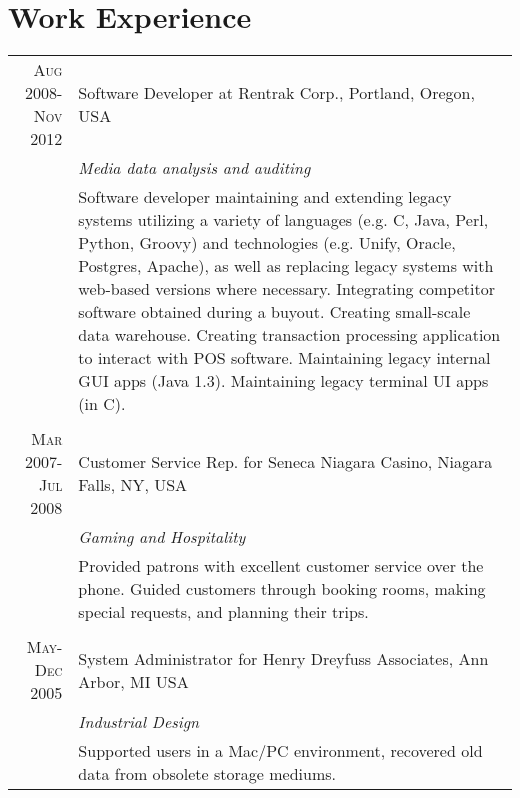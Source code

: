 \documentclass[a4paper,10pt]{article}
\begin{document}
\section{Work Experience}
\begin{tabular}{r|p{11cm}}
    \textsc{Aug 2008-Nov 2012}  & Software Developer at Rentrak Corp., Portland, Oregon, USA\\
                                & \emph{Media data analysis and auditing}\\
                                & \fontsize{9pt}{10pt}\selectfont
                                        Software developer maintaining and extending legacy systems utilizing a variety
                                        of languages (e.g. C, Java, Perl, Python, Groovy) and technologies (e.g. Unify,
                                        Oracle, Postgres, Apache), as well as replacing legacy systems with web-based
                                        versions where necessary. Integrating competitor software obtained during a
                                        buyout. Creating small-scale data warehouse. Creating transaction processing
                                        application to interact with POS software. Maintaining legacy internal GUI apps
                                        (Java 1.3). Maintaining legacy terminal UI apps (in C). \\
\multicolumn{2}{c}{}\\
    \textsc{Mar 2007-Jul 2008}   & Customer Service Rep. for Seneca Niagara Casino, Niagara Falls, NY, USA\\
                                    &\emph{Gaming and Hospitality}\\
                                    & \fontsize{9pt}{10pt}\selectfont
                                                    Provided patrons with excellent customer service over the phone. Guided
                                                    customers through booking rooms, making special requests, and planning their
                                                    trips.\\
\multicolumn{2}{c}{}\\
    \textsc{May-Dec 2005}   & System Administrator for Henry Dreyfuss Associates, Ann Arbor, MI USA\\
                            &\emph{Industrial Design}\\
                            & \fontsize{9pt}{10pt}\selectfont
                                                    Supported users in a Mac/PC environment, recovered old data from obsolete
                                                    storage mediums.\\
\end{tabular}
\end{document}
